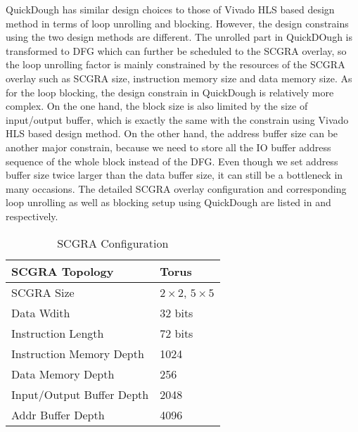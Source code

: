 QuickDough has similar design choices to those of Vivado HLS based design method in terms of loop unrolling and blocking. However, the design constrains using the two design methods are different. The unrolled part in QuickDOugh is transformed to DFG which can further be scheduled to the SCGRA overlay, so the loop unrolling factor is mainly constrained by the resources of the SCGRA overlay such as SCGRA size, instruction memory size and data memory size. As for the loop blocking, the design constrain in QuickDough is relatively more complex. On the one hand, the block size is also limited by the size of input/output buffer, which is exactly the same with the constrain using Vivado HLS based design method. On the other hand, the address buffer size can be another major constrain, because we need to store all the IO buffer address sequence of the whole block instead of the DFG. Even though we set address buffer size twice larger than the data buffer size, it can still be a bottleneck in many occasions. The detailed SCGRA overlay configuration and corresponding loop unrolling as well as blocking setup using QuickDough are listed in  and  respectively. 

\begin{table}[htb]
\caption{SCGRA Configuration}
\label{tab:scgra-config}
\centering
\begin{tabular}{|l|l|}

\hline
{SCGRA Topology} & {Torus} \\ \hline
{SCGRA Size} & {$2 \times 2$, $5 \times 5$} \\ \hline
{Data Wdith} & {32 bits} \\ \hline
{Instruction Length} & {72 bits} \\ \hline
{Instruction Memory Depth} & {1024} \\ \hline
{Data Memory Depth} & {256} \\ \hline
{Input/Output Buffer Depth} & {2048} \\ \hline
{Addr Buffer Depth} & {4096} \\ \hline

\end{tabular}
\end{table}

